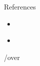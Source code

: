 \documentclass[compress]{beamer}
\begin{document}
\begin{frame}{References}
  \begin{itemize}
  \item \cite{dean.2008.mr}
  \end{itemize}
  \begin{itemize}
  \item \cite{leo.2010.pydoop}
  \end{itemize}
\end{frame}


\begin{frame}
\begin{center}
  /over
\end{center}  
\end{frame}
\end{document}
